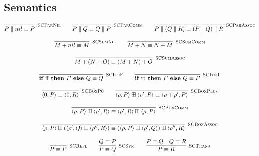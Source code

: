 \subsection{Semantics}
	\begin{gather*}
    \infer[\mbox{\footnotesize\scshape SCParNil}]{P \parallel nil \equiv P}{} \qquad
    \infer[\mbox{\footnotesize\scshape SCParComm}]{P \parallel Q \equiv Q \parallel P}{} \qquad
    \infer[\mbox{\footnotesize\scshape SCParAssoc}]{P \parallel (Q \parallel R) \equiv (P \parallel Q) \parallel R}{} \\[0.3cm]
    \infer[\mbox{\footnotesize\scshape SCSumNil}]{M + nil \equiv M}{} \qquad
    \infer[\mbox{\footnotesize\scshape SCSumComm}]{M + N \equiv N + M}{} \\[0.3cm]
    \infer[\mbox{\footnotesize\scshape SCSumAssoc}]{M + (N + O) \equiv (M + N) + O}{} \\[0.3cm]
    \infer[\mbox{\footnotesize\scshape SCIteF}]{\ite{\text{ff}}{P}{Q} \equiv Q}{} \qquad
    \infer[\mbox{\footnotesize\scshape SCIteT}]{\ite{\text{tt}}{P}{Q} \equiv P}{} \\[0.3cm]
    \infer[\mbox{\footnotesize\scshape SCBoxP0}]{\langle 0, P \rangle \equiv \langle 0, R \rangle}{} \qquad
    \infer[\mbox{\footnotesize\scshape SCBoxPlus}]{\langle \rho, P \rangle \boxplus \langle \rho', P \rangle \equiv \langle \rho + \rho', P \rangle}{} \\[0.3cm]
    \infer[\mbox{\footnotesize\scshape SCBoxComm}]{\langle \rho, P \rangle \boxplus \langle \rho', R \rangle \equiv \langle \rho', R \rangle \boxplus \langle \rho, P \rangle}{} \\[0.3cm]
    \infer[\mbox{\footnotesize\scshape SCBoxAssoc}]{\langle \rho, P \rangle \boxplus (\langle \rho', Q \rangle \boxplus \langle \rho'', R \rangle) \equiv (\langle \rho, P \rangle \boxplus \langle \rho', Q \rangle) \boxplus \langle \rho'', R \rangle}{} \\[0.3cm]
    \infer[\mbox{\footnotesize\scshape SCRefl}]{P \equiv P}{} \qquad
    \infer[\mbox{\footnotesize\scshape SCSym}]{P \equiv Q}{Q \equiv P} \qquad
    \infer[\mbox{\footnotesize\scshape SCTrans}]{P \equiv R}{P \equiv Q & Q \equiv R} \\[0.3cm]
	\end{gather*}	

